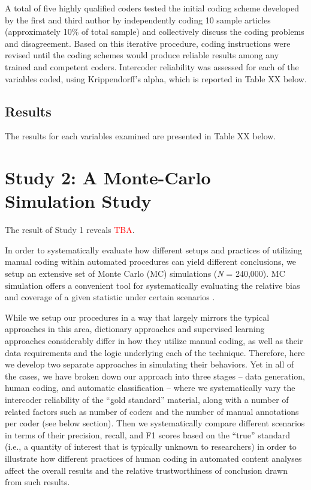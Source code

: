 \documentclass[man, 12pt, a4paper, nolmodern, noextraspace]{apa6}
\begin{document}
    A total of five highly qualified coders tested the initial coding scheme developed by the first and third author by independently coding 10 sample articles (approximately 10\% of total sample) and collectively discuss the coding problems and disagreement. Based on this iterative procedure, coding instructions were revised until the coding schemes would produce reliable results among any trained and competent coders. Intercoder reliability was assessed for each of the variables coded, using Krippendorff’s alpha, which is reported in Table XX below.   
    
\subsection{Results}

    The results for each variables examined are presented in Table XX below. 

\section{Study 2: A Monte-Carlo Simulation Study}
    
    The result of Study 1 reveals \textcolor{red}{TBA}. 
    
    In order to systematically evaluate how different setups and practices of utilizing manual coding within automated procedures can yield different conclusions, we setup an extensive set of Monte Carlo (MC) simulations (\textit{N} = 240,000). MC simulation offers a convenient tool for systematically evaluating the relative bias and coverage of a given statistic under certain scenarios \parencites[for an example, see][]{scharkow2017measurement, leemann2017extending}. 
    
    While we setup our procedures in a way that largely mirrors the typical approaches in this area, dictionary approaches and supervised learning approaches considerably differ in how they utilize manual coding, as well as their data requirements and the logic underlying each of the technique. Therefore, here we develop two separate approaches in simulating their behaviors. Yet in all of the cases, we have broken down our approach into three stages – data generation, human coding, and automatic classification – where we systematically vary the intercoder reliability of the “gold standard” material, along with a number of related factors such as number of coders and the number of manual annotations per coder (see below section). Then we systematically compare different scenarios in terms of their precision, recall, and F1 scores based on the \enquote{true} standard (i.e., a quantity of interest that is typically unknown to researchers) in order to illustrate how different practices of human coding in automated content analyses affect the overall results and the relative trustworthiness of conclusion drawn from such results.
    
\end{document}
